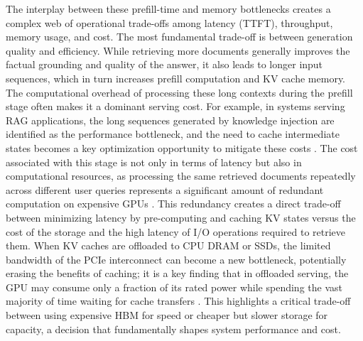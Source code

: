 \documentclass[11pt]{article}
\begin{document}
The interplay between these prefill-time and memory bottlenecks creates a complex web of operational trade-offs among latency (TTFT), throughput, memory usage, and cost. The most fundamental trade-off is between generation quality and efficiency. While retrieving more documents generally improves the factual grounding and quality of the answer, it also leads to longer input sequences, which in turn increases prefill computation and KV cache memory. The computational overhead of processing these long contexts during the prefill stage often makes it a dominant serving cost. For example, in systems serving RAG applications, the long sequences generated by knowledge injection are identified as the performance bottleneck, and the need to cache intermediate states becomes a key optimization opportunity to mitigate these costs \cite{ref510}. The cost associated with this stage is not only in terms of latency but also in computational resources, as processing the same retrieved documents repeatedly across different user queries represents a significant amount of redundant computation on expensive GPUs \cite{ref515}. This redundancy creates a direct trade-off between minimizing latency by pre-computing and caching KV states versus the cost of the storage and the high latency of I/O operations required to retrieve them. When KV caches are offloaded to CPU DRAM or SSDs, the limited bandwidth of the PCIe interconnect can become a new bottleneck, potentially erasing the benefits of caching; it is a key finding that in offloaded serving, the GPU may consume only a fraction of its rated power while spending the vast majority of time waiting for cache transfers \cite{ref516}. This highlights a critical trade-off between using expensive HBM for speed or cheaper but slower storage for capacity, a decision that fundamentally shapes system performance and cost.
\end{document}
